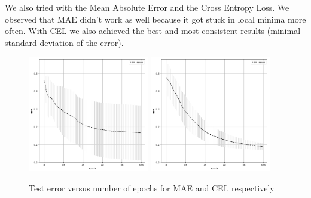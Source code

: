 \documentclass{article}
\begin{document}
We also tried with the Mean Absolute Error and the Cross Entropy Loss. We observed that MAE didn't work as well because it got stuck in local minima more often. With CEL we also achieved the best and most consistent results (minimal standard deviation of the error).
  
\begin{figure}[H]
\begin{center}
\includegraphics[width=0.47\textwidth]{err_mae}
\includegraphics[width=0.47\textwidth]{cel_err}
\caption{Test error versus number of epochs for MAE and CEL respectively}
\end{center}
\end{figure}
\end{document}
